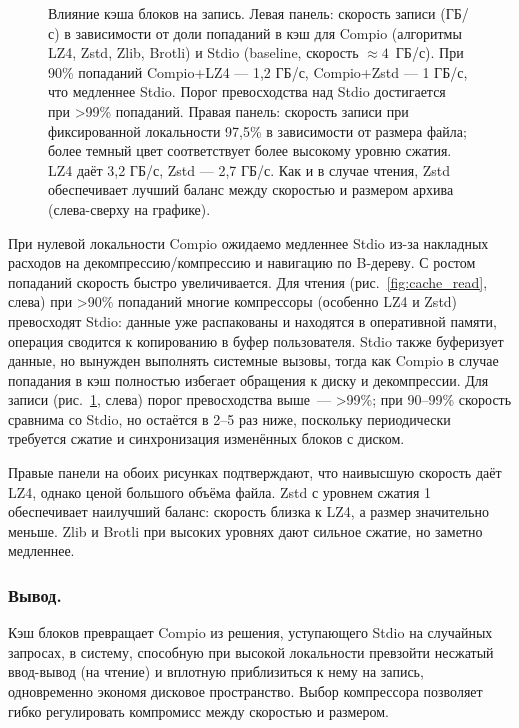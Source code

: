 \begin{figure}[h]
\centering

\caption{Влияние кэша блоков на запись. Левая панель: скорость записи (ГБ/с) в зависимости от доли попаданий в кэш для Compio (алгоритмы LZ4, Zstd, Zlib, Brotli) и Stdio (baseline, скорость $\approx4$~ГБ/с). При 90\% попаданий Compio+LZ4 --- 1,2 ГБ/с, Compio+Zstd --- 1 ГБ/с, что медленнее Stdio. Порог превосходства над Stdio достигается при >99\% попаданий. Правая панель: скорость записи при фиксированной локальности 97,5\% в зависимости от размера файла; более темный цвет соответствует более высокому уровню сжатия. LZ4 даёт 3,2 ГБ/с, Zstd --- 2,7 ГБ/с. Как и в случае чтения, Zstd обеспечивает лучший баланс между скоростью и размером архива (слева-сверху на графике).}
\label{fig:cache_write}
\end{figure}

При нулевой локальности Compio ожидаемо медленнее Stdio из-за накладных расходов на декомпрессию/компрессию и навигацию по B-дереву. С ростом попаданий скорость быстро увеличивается. Для чтения (рис.~\ref{fig:cache_read}, слева) при >90\% попаданий многие компрессоры (особенно LZ4 и Zstd) превосходят Stdio: данные уже распакованы и находятся в оперативной памяти, операция сводится к копированию в буфер пользователя. Stdio также буферизует данные, но вынужден выполнять системные вызовы, тогда как Compio в случае попадания в кэш полностью избегает обращения к диску и декомпрессии. Для записи (рис.~\ref{fig:cache_write}, слева) порог превосходства выше~--- >99\%; при 90--99\% скорость сравнима со Stdio, но остаётся в 2--5 раз ниже, поскольку периодически требуется сжатие и синхронизация изменённых блоков с диском.

Правые панели на обоих рисунках подтверждают, что наивысшую скорость даёт LZ4, однако ценой большого объёма файла. Zstd с уровнем сжатия 1 обеспечивает наилучший баланс: скорость близка к LZ4, а размер значительно меньше. Zlib и Brotli при высоких уровнях дают сильное сжатие, но заметно медленнее.

\subsubsection{Вывод.}
Кэш блоков превращает Compio из решения, уступающего Stdio на случайных запросах, в систему, способную при высокой локальности превзойти несжатый ввод-вывод (на чтение) и вплотную приблизиться к нему на запись, одновременно экономя дисковое пространство. Выбор компрессора позволяет гибко регулировать компромисс между скоростью и размером.

